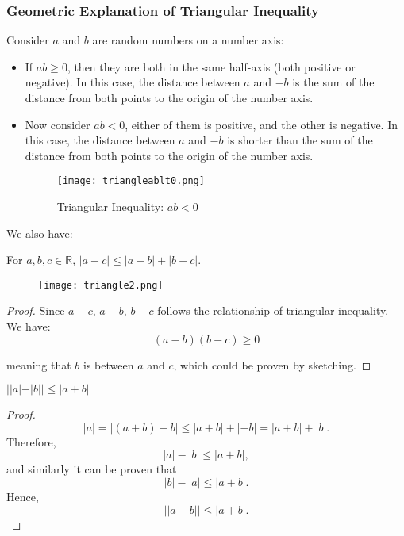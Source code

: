 \subsubsection*{Geometric Explanation of Triangular Inequality}
    Consider $a$ and $b$ are random numbers on a number axis:
    \begin{itemize}
        \item If $ab \geq 0$, then they are both in the same half-axis (both positive or negative). In this case, the distance between $a$ and $-b$
        is the sum of the distance from both points to the origin of the number axis.
        \item  Now consider $ab < 0$, either of them is positive, and the other is negative. In this case, the distance between $a$ and $-b$ is shorter than the sum of 
        the distance from both points to the origin of the number axis.
        \begin{figure}[H]
            \centering
            \texttt{[image: triangleablt0.png]}
            \caption{Triangular Inequality: $ab < 0$}
        \end{figure}
    \end{itemize}

We also have:
    \begin{theorem}
        For $a, b, c\in \mathbb{R}$, $|a-c|\leq |a-b| + |b-c|$.
    \end{theorem}
    \begin{figure}[H]
        \centering
        \texttt{[image: triangle2.png]}
    \end{figure}
    \begin{proof}
        Since $a-c$, $a-b$, $b-c$ follows the relationship of triangular inequality. We have:
        $$(a-b)(b-c) \geq 0$$
        
        meaning that $b$ is between $a$ and $c$, which could be proven by sketching.
    \end{proof}

    \begin{corollary} \label{trian}
        $||a| - |b|| \leq |a + b|$
    \end{corollary}
    \begin{proof}
        \[ |a| = |(a+b) - b| \leq |a+b| + |-b| = |a+b| + |b|. \]
Therefore,
\[ |a| - |b| \leq |a+b|, \]
and similarly it can be proven that
\[ |b| - |a| \leq |a+b|. \]
Hence,
\[ ||a - b|| \leq |a+b|. \]
    \end{proof}

